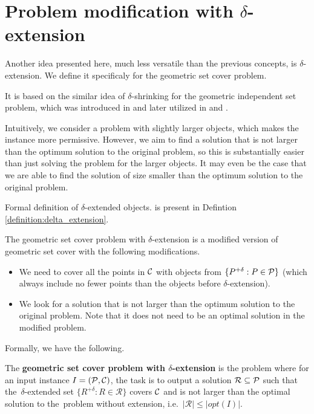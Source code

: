 \section{Problem modification with $\delta$-extension}

Another idea presented here, much less versatile than the previous concepts,
is $\delta$-extension.
We define it specificaly for the geometric set cover problem.

It is based on the similar idea of $\delta$-shrinking
for the geometric independent set problem,
which was introduced in \cite{shrinking_original} and later utilized in
\cite{shriking1} and \cite{shrinking2}.

Intuitively, we consider a problem with slightly larger objects,
which makes the instance more permissive.
However, we aim to find a solution that
is not larger than the
optimum solution to the original problem,
so this is substantially easier than just
solving the problem for the larger objects.
It may even be the case
that we are able to find the solution
of size smaller than the optimum solution
to the original problem.

Formal definition of $\delta$-extended objects.
is present in Defintion
\ref{definition:delta_extension}.

The geometric set cover problem with $\delta$-extension
is a modified version of geometric set cover with
the following modifications.
\begin{itemize}
\item We need to cover all the points in $\mathcal{C}$
with objects from $\{P^{+\delta} : P \in \mathcal{P}\}$ (which always 
include no fewer points than the objects
before $\delta$-extension).
\item We look for a solution that is not larger than the optimum
solution to the original problem.
Note that it does not need to be an optimal solution in
the modified problem.
\end{itemize}

Formally, we have the following.

\begin{defi}
The \textbf{geometric set cover problem
with $\delta$-extension} is the problem where for an input instance
$I=(\mathcal{P}, \mathcal{C})$,
the task is to output a solution $\mathcal{R} \subseteq \mathcal{P}$
such that the~$\delta$-extended set
$\{ R^{+\delta} :  R \in \mathcal{R} \}$ covers $\mathcal{C}$
and is not larger than the optimal solution to the~problem without
extension, i.e.~$|\mathcal{R}| \le |opt(I)|$.
\end{defi}

